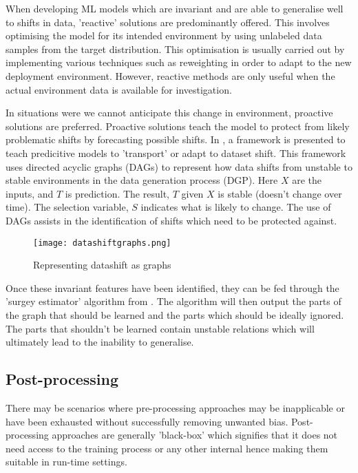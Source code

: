 When developing ML models which are invariant and are able to generalise well to shifts in data, 'reactive' solutions are predominantly offered.
This involves optimising the model for its intended environment by using unlabeled data samples from the target distribution.
This optimisation is usually carried out by implementing various techniques such as reweighting in order to adapt to the new deployment environment.
However, reactive methods are only useful when the actual environment data is available for investigation. 

In situations were we cannot anticipate this change in environment, proactive solutions are preferred.
Proactive solutions teach the model to protect from likely problematic shifts by forecasting possible shifts.
In \cite{subbaswamy2019preventing}, a framework is presented to teach predicitive models to 'transport' or adapt to dataset shift.
This framework uses directed acyclic graphs (DAGs) to represent how data shifts from unstable to stable environments in the data generation process (DGP).
Here $X$ are the inputs, and $T$ is prediction. The result, $T$ given $X$ is stable (doesn't change over time).
The selection variable, $S$ indicates what is likely to change. The use of DAGs assists in the identification of shifts which need to be protected against.

\begin{figure}[H]
    \texttt{[image: datashiftgraphs.png]}
    \centering
    \caption{Representing datashift as graphs \cite{subbaswamy2019preventing}}
    \label{fig:DAG}
\end{figure}

Once these invariant features have been identified, they can be fed through the 'surgey estimator' algorithm from \cite{subbaswamy2019preventing}.
The algorithm will then output the parts of the graph that should be learned and the parts which should be ideally ignored.
The parts that shouldn't be learned contain unstable relations which will ultimately lead to the inability to generalise.

\subsection{Post-processing}
There may be scenarios where pre-processing approaches may be inapplicable or have been exhausted without successfully removing unwanted bias.
Post-processing approaches are generally 'black-box' which signifies that it does not need access to the training process or any other internal hence making them suitable in run-time settings.

